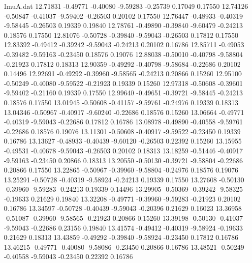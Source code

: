 \begin{filecontents}{ImuA.dat}
  12.71831   -0.49771   -0.40080   -9.59283   -0.25739    0.17049    0.17550
  12.74126   -0.50847   -0.41037   -9.59402   -0.26503    0.20102    0.17550
  12.76447   -0.48933   -0.40319   -9.58445   -0.26503    0.19339    0.19840
  12.78761   -0.49890   -0.39840   -9.60479   -0.24213    0.18576    0.17550
  12.81076   -0.50728   -0.39840   -9.59043   -0.26503    0.17812    0.17550
  12.83392   -0.49412   -0.39242   -9.59043   -0.24213    0.20102    0.16786
  12.85711   -0.49053   -0.39482   -9.59163   -0.23450    0.18576    0.19076
  12.88038   -0.50010   -0.40798   -9.58804   -0.21923    0.17812    0.18313
  12.90359   -0.49292   -0.40798   -9.58684   -0.22686    0.20102    0.14496
  12.92691   -0.49292   -0.39960   -9.58565   -0.24213    0.20866    0.15260
  12.95100   -0.50249   -0.40080   -9.59522   -0.21923    0.19339    0.15260
  12.97318   -0.50608   -0.39601   -9.59402   -0.21160    0.19339    0.17550
  12.99640   -0.49651   -0.39721   -9.58445   -0.24213    0.18576    0.17550
  13.01945   -0.50608   -0.41157   -9.59761   -0.24976    0.19339    0.18313
  13.04346   -0.50967   -0.40917   -9.60240   -0.22686    0.18576    0.15260
  13.06664   -0.49771   -0.40319   -9.59043   -0.22686    0.17812    0.16786
  13.08978   -0.49890   -0.40558   -9.59761   -0.22686    0.18576    0.19076
  13.11301   -0.50608   -0.40917   -9.59522   -0.23450    0.19339    0.16786
  13.13627   -0.48933   -0.40439   -9.60120   -0.26503    0.22392    0.15260
  13.15955   -0.49531   -0.40678   -9.59043   -0.26503    0.20102    0.18313
  13.18259   -0.51446   -0.40917   -9.59163   -0.23450    0.20866    0.18313
  13.20550   -0.50130   -0.39721   -9.58804   -0.22686    0.20866    0.17550
  13.22865   -0.50967   -0.39960   -9.58804   -0.24976    0.18576    0.19076
  13.25291   -0.50728   -0.40319   -9.58924   -0.24213    0.19339    0.17550
  13.27608   -0.50130   -0.39960   -9.59283   -0.24213    0.19339    0.14496
  13.29905   -0.50369   -0.39242   -9.58325   -0.19633    0.21629    0.19840
  13.32208   -0.49771   -0.39960   -9.59283   -0.21923    0.20102    0.16786
  13.34597   -0.50728   -0.40439   -9.59043   -0.20396    0.21629    0.16023
  13.36958   -0.51087   -0.39960   -9.58565   -0.21923    0.20866    0.15260
  13.39198   -0.50130   -0.41037   -9.59043   -0.22686    0.23156    0.19840
  13.41574   -0.49412   -0.40319   -9.58924   -0.19633    0.21629    0.18313
  13.43859   -0.49292   -0.39840   -9.58924   -0.23450    0.17812    0.16786
  13.46215   -0.49771   -0.40080   -9.58086   -0.23450    0.20866    0.16786
  13.48521   -0.50249   -0.40558   -9.59043   -0.23450    0.22392    0.16786

\end{filecontents}
